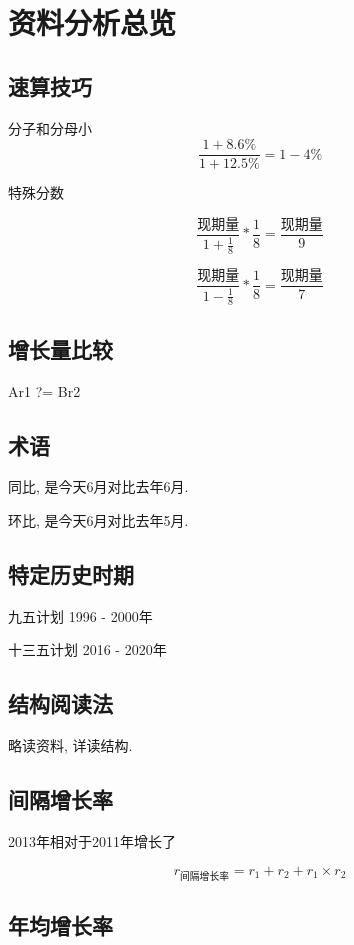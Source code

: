 \documentclass[UTF8]{ctexart}
\begin{document}
\section{资料分析总览}


\subsection{速算技巧}

分子和分母小
$$
	\frac{1+8.6\%}{1+12.5\%} = 1- 4\%
$$

特殊分数

$$
	\frac{\mbox{现期量}}{1+\frac{1}{8}} * \frac{1}{8} = \frac{\mbox{现期量}}{9}
$$

$$
	\frac{\mbox{现期量}}{1-\frac{1}{8}} * \frac{1}{8} = \frac{\mbox{现期量}}{7}
$$

\subsection{增长量比较}

Ar1 ?= Br2



\subsection{术语}
同比, 是今天6月对比去年6月.

环比, 是今天6月对比去年5月.

\subsection{特定历史时期}

九五计划 1996 - 2000年

十三五计划 2016 - 2020年

\subsection{结构阅读法}

略读资料, 详读结构.

\subsection{间隔增长率}

2013年相对于2011年增长了

$$
	r_{间隔增长率} = r_1 + r_2 + r_1 \times r_2
$$

\subsection{年均增长率}
\end{document}
